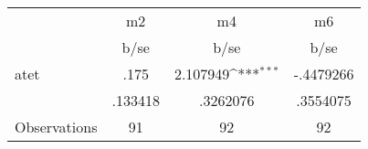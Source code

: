 {
\def\sym#1{\ifmmode^{#1}\else\(^{#1}\)\fi}
\begin{tabular}{l*{3}{c}}
\toprule
                &       m2         &       m4         &       m6         \\
                &     b/se         &     b/se         &     b/se         \\
\midrule
atet            &     .175         & 2.107949\sym{***}&-.4479266         \\
                &  .133418         & .3262076         & .3554075         \\
\midrule
Observations    &       91         &       92         &       92         \\
\bottomrule
\end{tabular}
}
